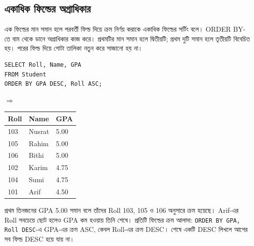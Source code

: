 \subsection{একাধিক ফিল্ডের অগ্রাধিকার}
এক ফিল্ডের মান সমান হলে পরবর্তী ফিল্ড দিয়ে ক্রম নির্ণয় করাকে একাধিক ফিল্ডের সর্টিং বলে। ORDER BY-তে বাম থেকে ডানে অগ্রাধিকার কাজ করে। প্রথমটির মান সমান হলে দ্বিতীয়টি; প্রথম দুটি সমান হলে তৃতীয়টি বিবেচিত হয়। পরের ফিল্ড দিয়ে গোটা তালিকা নতুন করে সাজানো হয় না।
\par\smallskip\noindent\begin{minipage}{\linewidth}
\begin{minipage}[c]{.54\linewidth}
\begin{verbatim}
SELECT Roll, Name, GPA
FROM Student
ORDER BY GPA DESC, Roll ASC;
\end{verbatim}
\end{minipage}\hfill\begin{minipage}[c]{.04\linewidth}$\Rightarrow$\end{minipage}\hfill
\begin{minipage}[c]{.39\linewidth}\raggedright\small
\begin{tabular}{|l|l|l|}\hline
Roll & Name & GPA\\\hline
103 & Nusrat & 5.00\\\hline105 & Rahim & 5.00\\\hline106 & Bithi & 5.00\\\hline
102 & Karim & 4.75\\\hline104 & Sumi & 4.75\\\hline101 & Arif & 4.50\\\hline
\end{tabular}
\end{minipage}
\end{minipage}\par\smallskip
প্রথম তিনজনের GPA 5.00 সমান বলে তাঁদের Roll 103, 105 ও 106 অনুসারে ক্রম হয়েছে। Arif-এর Roll সবচেয়ে ছোট হলেও GPA কম হওয়ায় তিনি শেষে। প্রতিটি ফিল্ডের ক্রম আলাদা: \texttt{ORDER BY GPA, Roll DESC}-এ GPA-এর ক্রম ASC, কেবল Roll-এর ক্রম DESC। শেষে একটি DESC লিখলে আগের সব ফিল্ড DESC হয়ে যায় না।


